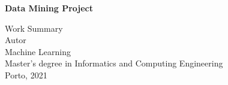 \documentclass[a4paper,12pt]{report}
\begin{document}
	\begin{titlepage}
		
		\begin{center}
		
		
		
		\vspace{3cm}
		\huge
		\textbf{Data Mining Project}
		
		\Large
		Work Summary\\
		
		
		\vspace{2.5cm}
		\large
		Autor\\

		
		\vspace{3cm}
		Machine Learning\\
		Master's degree in Informatics and Computing Engineering \\
		
		\vspace{2cm}		
		Porto, 2021
		
		\end{center}
	\end{titlepage}	
	
	
	
	
	\begin{abstract}
	
	\end{abstract}	
	
	
	\newpage
	\tableofcontents
	
	\newpage	
	



	
\end{document}
